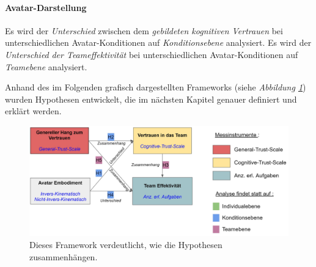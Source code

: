 \documentclass[a4paper,11pt]{article}%
\renewcommand{\\}{\vspace*{0.5\baselineskip} \newline}
\begin{document}
{\paragraph{Avatar-Darstellung}
Es wird der \textit{Unterschied} zwischen dem \textit{gebildeten kognitiven Vertrauen} bei unterschiedlichen Avatar-Konditionen auf \textit{Konditionsebene} analysiert.
Es wird der \textit{Unterschied} \textit{der Teameffektivität} bei unterschiedlichen Avatar-Konditionen auf \textit{Teamebene} analysiert.

Anhand des im Folgenden grafisch dargestellten Frameworks (siehe \textit{Abbildung \ref{Versuchshypothesen}}) wurden Hypothesen entwickelt, die im nächsten Kapitel genauer definiert und erklärt werden.

\begin{figure}[H]
		\begin{footnotesize}
			\includegraphics[width=\textwidth]{Abbildungen/Versuchshypothesen_02.JPG}		
			\caption[Das Framework der Versuchshypothesen]{Dieses Framework verdeutlicht, wie die Hypothesen zusammenhängen.}
			\label{Versuchshypothesen}
		\end{footnotesize}
	\end{figure}	

\newpage



}
\end{document}
